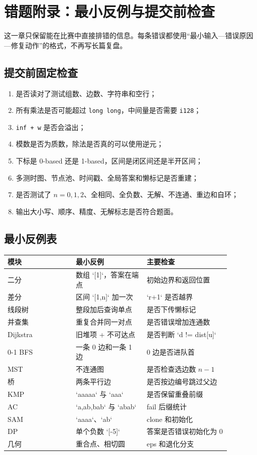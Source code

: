 \chapter{错题附录：最小反例与提交前检查}

这一章只保留能在比赛中直接排错的信息。每条错误都使用“最小输入—错误原因—修复动作”的格式，不再写长篇复盘。

\section{提交前固定检查}

\begin{enumerate}
\item 是否读对了测试组数、边数、字符串和空行；
\item 所有乘法是否可能超过 \texttt{long long}，中间量是否需要 \texttt{i128}；
\item \texttt{inf + w} 是否会溢出；
\item 模数是否为质数，除法是否真的可以使用逆元；
\item 下标是 0-based 还是 1-based，区间是闭区间还是半开区间；
\item 多测时图、节点池、时间戳、全局答案和懒标记是否重建；
\item 是否测试了 \(n=0,1,2\)、全相同、全负数、无解、不连通、重边和自环；
\item 输出大小写、顺序、精度、无解标志是否符合题面。
\end{enumerate}

\section{最小反例表}

\begin{tabular}{p{0.27\linewidth}|p{0.28\linewidth}|p{0.33\linewidth}}
\textbf{模块} & \textbf{最小反例} & \textbf{主要检查}\\ \hline
二分 & 数组 `[1]`，答案在端点 & 初始边界和返回位置\\
差分 & 区间 `[1,n]` 加一次 & `r+1` 是否越界\\
线段树 & 整段加后查询单点 & 是否下传懒标记\\
并查集 & 重复合并同一对点 & 是否错误增加连通数\\
Dijkstra & 旧堆项 + 不可达点 & 是否判断 `d != dist[u]`\\
0-1 BFS & 一条 0 边和一条 1 边 & 0 边是否进队首\\
MST & 不连通图 & 是否检查选边数 \(n-1\)\\
桥 & 两条平行边 & 是否按边编号跳过父边\\
KMP & `aaaaa` 与 `aaa` & 是否保留重叠前缀\\
AC & `a,ab,bab` 与 `abab` & fail 后缀统计\\
SAM & `aaaa`、`ab` & clone 和初始化\\
DP & 单个负数 `[-5]` & 答案是否错误初始化为 0\\
几何 & 重合点、相切圆 & eps 和退化分支
\end{tabular}

